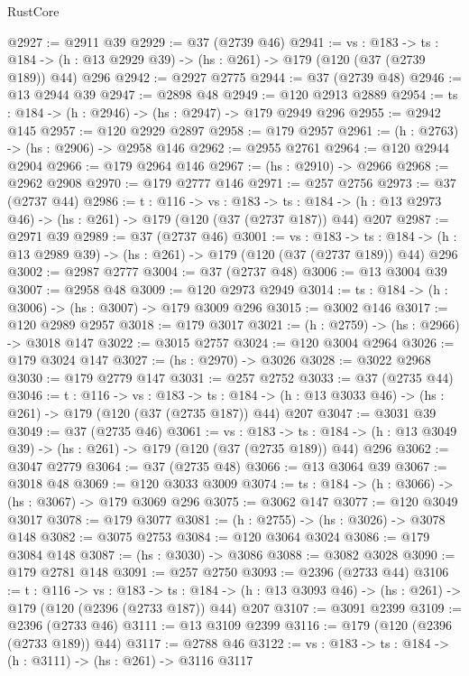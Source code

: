 \begin{lexlean}{RustCore}
\begin{coremodule}
@2927 := @2911 @39
@2929 := @37 (@2739 @46)
@2941 := {vs : @183} ->
  {ts : @184} -> (h : @13 @2929 @39) -> (hs : @261) -> @179 (@120 (@37 (@2739 @189)) @44) @296
@2942 := @2927 @2775
@2944 := @37 (@2739 @48)
@2946 := @13 @2944 @39
@2947 := @2898 @48
@2949 := @120 @2913 @2889
@2954 := {ts : @184} -> (h : @2946) -> (hs : @2947) -> @179 @2949 @296
@2955 := @2942 @145
@2957 := @120 @2929 @2897
@2958 := @179 @2957
@2961 := (h : @2763) -> (hs : @2906) -> @2958 @146
@2962 := @2955 @2761
@2964 := @120 @2944 @2904
@2966 := @179 @2964 @146
@2967 := (hs : @2910) -> @2966
@2968 := @2962 @2908
@2970 := @179 @2777 @146
@2971 := @257 @2756
@2973 := @37 (@2737 @44)
@2986 := {t : @116} ->
  {vs : @183} ->
  {ts : @184} -> (h : @13 @2973 @46) -> (hs : @261) -> @179 (@120 (@37 (@2737 @187)) @44) @207
@2987 := @2971 @39
@2989 := @37 (@2737 @46)
@3001 := {vs : @183} ->
  {ts : @184} -> (h : @13 @2989 @39) -> (hs : @261) -> @179 (@120 (@37 (@2737 @189)) @44) @296
@3002 := @2987 @2777
@3004 := @37 (@2737 @48)
@3006 := @13 @3004 @39
@3007 := @2958 @48
@3009 := @120 @2973 @2949
@3014 := {ts : @184} -> (h : @3006) -> (hs : @3007) -> @179 @3009 @296
@3015 := @3002 @146
@3017 := @120 @2989 @2957
@3018 := @179 @3017
@3021 := (h : @2759) -> (hs : @2966) -> @3018 @147
@3022 := @3015 @2757
@3024 := @120 @3004 @2964
@3026 := @179 @3024 @147
@3027 := (hs : @2970) -> @3026
@3028 := @3022 @2968
@3030 := @179 @2779 @147
@3031 := @257 @2752
@3033 := @37 (@2735 @44)
@3046 := {t : @116} ->
  {vs : @183} ->
  {ts : @184} -> (h : @13 @3033 @46) -> (hs : @261) -> @179 (@120 (@37 (@2735 @187)) @44) @207
@3047 := @3031 @39
@3049 := @37 (@2735 @46)
@3061 := {vs : @183} ->
  {ts : @184} -> (h : @13 @3049 @39) -> (hs : @261) -> @179 (@120 (@37 (@2735 @189)) @44) @296
@3062 := @3047 @2779
@3064 := @37 (@2735 @48)
@3066 := @13 @3064 @39
@3067 := @3018 @48
@3069 := @120 @3033 @3009
@3074 := {ts : @184} -> (h : @3066) -> (hs : @3067) -> @179 @3069 @296
@3075 := @3062 @147
@3077 := @120 @3049 @3017
@3078 := @179 @3077
@3081 := (h : @2755) -> (hs : @3026) -> @3078 @148
@3082 := @3075 @2753
@3084 := @120 @3064 @3024
@3086 := @179 @3084 @148
@3087 := (hs : @3030) -> @3086
@3088 := @3082 @3028
@3090 := @179 @2781 @148
@3091 := @257 @2750
@3093 := @2396 (@2733 @44)
@3106 := {t : @116} ->
  {vs : @183} ->
  {ts : @184} -> (h : @13 @3093 @46) -> (hs : @261) -> @179 (@120 (@2396 (@2733 @187)) @44) @207
@3107 := @3091 @2399
@3109 := @2396 (@2733 @46)
@3111 := @13 @3109 @2399
@3116 := @179 (@120 (@2396 (@2733 @189)) @44)
@3117 := @2788 @46
@3122 := {vs : @183} -> {ts : @184} -> (h : @3111) -> (hs : @261) -> @3116 @3117

\end{coremodule}
\end{lexlean}
